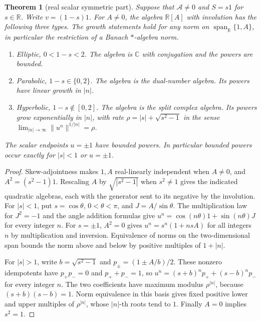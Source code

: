 \documentclass[11pt,reqno]{amsart}
\newtheorem{theorem}{Theorem}[section]
\theoremstyle{definition}
\theoremstyle{remark}
\numberwithin{equation}{section}
\begin{document}
\begin{theorem}[real scalar symmetric part]\label{m1:trichotomy}
Suppose that \(\mathcal A\ne0\) and \(S=s1\) for \(s\in\mathbb R\).
Write \(v=(1-s)1\). For \(A\ne0\), the algebra \(\mathbb R[A]\)
with involution has the following three types. The growth statements
hold for any norm on \(\operatorname{span}_{\mathbb R}\{1,A\}\), in
particular the restriction of a Banach \(*\)-algebra norm.
\begin{enumerate}
\item Elliptic, \(0<1-s<2\). The algebra is \(\mathbb C\) with
conjugation and the powers are bounded.
\item Parabolic, \(1-s\in\{0,2\}\). The algebra is the dual-number
algebra. Its powers have linear growth in \(|n|\).
\item Hyperbolic, \(1-s\notin[0,2]\). The algebra is the split
complex algebra. Its powers grow exponentially in \(|n|\), with rate
\(\rho=|s|+\sqrt{s^2-1}\) in the sense
\(\lim_{|n|\to\infty}\|u^n\|^{1/|n|}=\rho\).
\end{enumerate}
The scalar endpoints \(u=\pm1\) have bounded powers. In particular
bounded powers occur exactly for \(|s|<1\) or \(u=\pm1\).
\end{theorem}
\begin{proof}
Skew-adjointness makes \(1,A\) real-linearly independent when
\(A\ne0\), and \(A^2=(s^2-1)1\). Rescaling \(A\) by
\(\sqrt{|s^2-1|}\) when \(s^2\ne1\) gives the indicated quadratic
algebras, each with the generator sent to its negative by the
involution. For \(|s|<1\), put \(s=\cos\theta\), \(0<\theta<\pi\), and
\(J=A/\sin\theta\). The multiplication law for \(J^2=-1\) and the
angle addition formulas give \(u^n=\cos(n\theta)1+\sin(n\theta)J\)
for every integer \(n\).
For \(s=\pm1\), \(A^2=0\) gives \(u^n=s^n(1+nsA)\) for all integers
\(n\) by multiplication and inversion. Equivalence of norms on the
two-dimensional span bounds the norm above and below by positive
multiples of \(1+|n|\).

For \(|s|>1\), write \(b=\sqrt{s^2-1}\) and \(p_\pm=(1\pm A/b)/2\).
These nonzero idempotents have \(p_+p_-=0\) and \(p_++p_-=1\), so
\(u^n=(s+b)^n p_++(s-b)^n p_-\) for every integer \(n\).
The two coefficients have maximum modulus \(\rho^{|n|}\), because
\((s+b)(s-b)=1\). Norm equivalence in this basis gives fixed
positive lower and upper multiples of \(\rho^{|n|}\), whose
\(|n|\)-th roots tend to \(1\). Finally \(A=0\) implies \(s^2=1\).
\end{proof}
\end{document}
